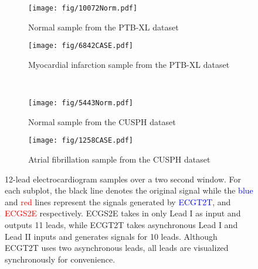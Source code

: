 \begin{figure*}[h]
\centering
\begin{subfigure}{.49\textwidth}
    \texttt{[image: fig/10072Norm.pdf]}
    
    \caption{Normal sample from the PTB-XL dataset}\label{fig:ptb-norm}
\end{subfigure} 
\begin{subfigure}{.49\textwidth}
    \texttt{[image: fig/6842CASE.pdf]}
    
    \caption{Myocardial infarction sample from the PTB-XL dataset}\label{fig:ptb-case}
\end{subfigure} \\
\begin{subfigure}{.49\textwidth}
    \texttt{[image: fig/5443Norm.pdf]}
    
    \caption{Normal sample from the CUSPH dataset}\label{fig:chap-norm}
\end{subfigure}
\begin{subfigure}{.49\textwidth}
    \texttt{[image: fig/1258CASE.pdf]}
    \caption{Atrial fibrillation sample from the CUSPH dataset}\label{fig:chap-case}
\end{subfigure}
\caption{12-lead electrocardiogram samples over a two second window. For each subplot, the black line denotes the original signal while the \textcolor{blue}{blue} and \textcolor{red}{red} lines represent the signals generated by \textcolor{blue}{ECGT2T}, and \textcolor{red}{ECGS2E} respectively. ECGS2E takes in only Lead I as input and outputs 11 leads, while ECGT2T takes asynchronous Lead I and Lead II inputs and generates signals for 10 leads. Although ECGT2T uses two asynchronous leads, all leads are visualized synchronously for convenience.
}
\label{fig:gen-ptb}
\end{figure*}